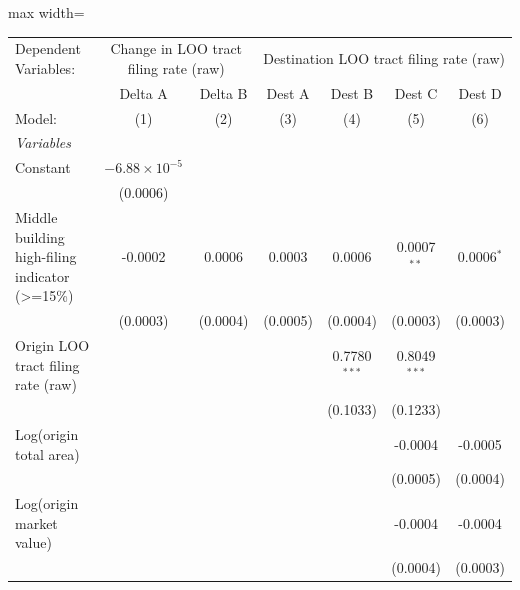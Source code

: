 \documentclass[
  11pt,
]{article}
\begin{document}
\begin{adjustbox}{max width=\textwidth}
\begingroup
\centering
\begin{tabular}{lcccccc}
   \tabularnewline \midrule \midrule
   Dependent Variables: & \multicolumn{2}{c}{Change in LOO tract filing rate (raw)} & \multicolumn{4}{c}{Destination LOO tract filing rate (raw)}\\
                                                   & Delta A                & Delta B  & Dest A   & Dest B         & Dest C         & Dest D \\   
   Model:                                          & (1)                    & (2)      & (3)      & (4)            & (5)            & (6)\\  
   \midrule
   \emph{Variables}\\
   Constant                                        & $-6.88\times 10^{-5}$  &          &          &                &                &   \\   
                                                   & (0.0006)               &          &          &                &                &   \\   
   Middle building high-filing indicator (>=15\%)  & -0.0002                & 0.0006   & 0.0003   & 0.0006         & 0.0007$^{**}$  & 0.0006$^{*}$\\   
                                                   & (0.0003)               & (0.0004) & (0.0005) & (0.0004)       & (0.0003)       & (0.0003)\\   
   Origin LOO tract filing rate (raw)              &                        &          &          & 0.7780$^{***}$ & 0.8049$^{***}$ &   \\   
                                                   &                        &          &          & (0.1033)       & (0.1233)       &   \\   
   Log(origin total area)                          &                        &          &          &                & -0.0004        & -0.0005\\   
                                                   &                        &          &          &                & (0.0005)       & (0.0004)\\   
   Log(origin market value)                        &                        &          &          &                & -0.0004        & -0.0004\\   
                                                   &                        &          &          &                & (0.0004)       & (0.0003)\\   

\end{tabular}
\end{adjustbox}
\end{document}
